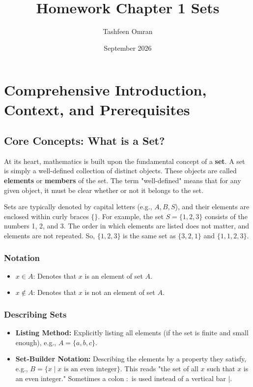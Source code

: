 \documentclass{article}
\title{Homework Chapter 1 Sets}
\author{Tashfeen Omran}
\date{September 2026}
\begin{document}
\maketitle

\section{Comprehensive Introduction, Context, and Prerequisites}

\subsection{Core Concepts: What is a Set?}
At its heart, mathematics is built upon the fundamental concept of a \textbf{set}. A set is simply a well-defined collection of distinct objects. These objects are called \textbf{elements} or \textbf{members} of the set. The term "well-defined" means that for any given object, it must be clear whether or not it belongs to the set.

Sets are typically denoted by capital letters (e.g., $A, B, S$), and their elements are enclosed within curly braces $\{ \}$. For example, the set $S = \{1, 2, 3\}$ consists of the numbers 1, 2, and 3. The order in which elements are listed does not matter, and elements are not repeated. So, $\{1, 2, 3\}$ is the same set as $\{3, 2, 1\}$ and $\{1, 1, 2, 3\}$.

\subsubsection{Notation}
\begin{itemize}
    \item $x \in A$: Denotes that $x$ is an element of set $A$.
    \item $x \notin A$: Denotes that $x$ is not an element of set $A$.
\end{itemize}

\subsubsection{Describing Sets}
\begin{itemize}
    \item \textbf{Listing Method:} Explicitly listing all elements (if the set is finite and small enough), e.g., $A = \{a, b, c\}$.
    \item \textbf{Set-Builder Notation:} Describing the elements by a property they satisfy, e.g., $B = \{x \mid x \text{ is an even integer}\}$. This reads "the set of all $x$ such that $x$ is an even integer." Sometimes a colon $:$ is used instead of a vertical bar $\mid$.
\end{itemize}
\end{document}
